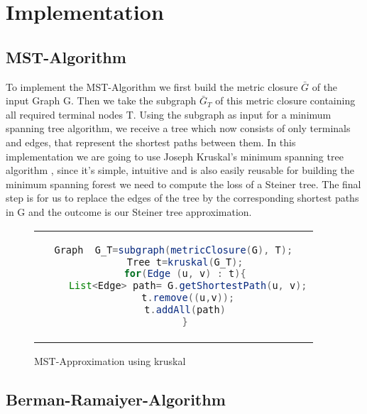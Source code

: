 
\chapter{Implementation}\label{chapter:implementation}

\section{MST-Algorithm}

To implement the MST-Algorithm we first build the metric closure $\bar{G}$ of the input Graph G. Then we take the subgraph $\bar{G}_T$ of this metric closure containing all required terminal nodes T. Using the subgraph as input for a minimum spanning tree algorithm, we receive a tree which now consists of only terminals and edges, that represent the shortest paths between them. In this implementation we are going to use Joseph Kruskal's minimum spanning tree algorithm \cite{kruskal1956shortest}, since it's simple, intuitive and is also easily reusable for building the minimum spanning forest we need to compute the loss of a Steiner tree. The final step is for us to replace the edges of the tree by the corresponding shortest paths in G and the outcome is our Steiner tree approximation.
\begin{figure}[htbp]
  \centering
  \begin{tabular}{c}
  \begin{lstlisting}[language=Java]
    Graph  G_T=subgraph(metricClosure(G), T);
    Tree t=kruskal(G_T);
    for(Edge (u, v) : t){
     List<Edge> path= G.getShortestPath(u, v);
     t.remove((u,v));
     t.addAll(path) 
    }
  \end{lstlisting}
  \end{tabular}
  \caption[mstPseudo]{MST-Approximation using kruskal}\label{fig:mstPseudo}
\end{figure}

\section{Berman-Ramaiyer-Algorithm}

